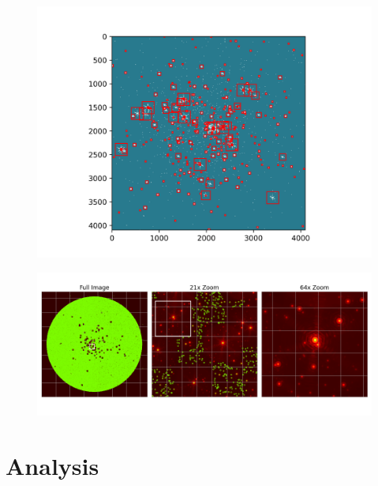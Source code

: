 \documentclass{beamer}
\begin{document}
\begin{frame}
\begin{figure}
\centering
\includegraphics[width=\textwidth,height=\textheight,keepaspectratio]{Images/masking.png}
\end{figure}
\end{frame}




\begin{frame}
\begin{figure}
\centering
\includegraphics[width=\textwidth,height=\textheight,keepaspectratio]{Images/fits_extracted.png}
\end{figure}
\end{frame}

\section{Analysis}
\end{document}
